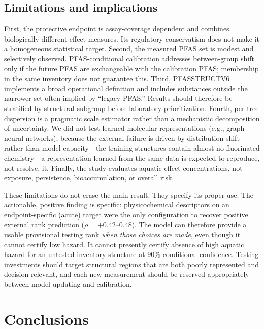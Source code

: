 \documentclass[journal=esthag,manuscript=article,margin=1in]{achemso}
\begin{document}
\subsection{Limitations and implications}

First, the protective endpoint is assay-coverage dependent and combines biologically different effect measures. Its regulatory conservatism does not make it a homogeneous statistical target. Second, the measured PFAS set is modest and selectively observed. PFAS-conditional calibration addresses between-group shift only if the future PFAS are exchangeable with the calibration PFAS; membership in the same inventory does not guarantee this. Third, PFASSTRUCTV6 implements a broad operational definition and includes substances outside the narrower set often implied by ``legacy PFAS.'' Results should therefore be stratified by structural subgroup before laboratory prioritization. Fourth, per-tree dispersion is a pragmatic scale estimator rather than a mechanistic decomposition of uncertainty. We did not test learned molecular representations (e.g., graph neural networks); because the external failure is driven by distribution shift rather than model capacity---the training structures contain almost no fluorinated chemistry---a representation learned from the same data is expected to reproduce, not resolve, it. Finally, the study evaluates aquatic effect concentrations, not exposure, persistence, bioaccumulation, or overall risk.

These limitations do not erase the main result. They specify its proper use. The actionable, positive finding is specific: physicochemical descriptors on an endpoint-specific (acute) target were the only configuration to recover positive external rank prediction ($\rho=+0.42$--$0.48$). The model can therefore provide a usable provisional testing rank \emph{when those choices are made}, even though it cannot certify low hazard. It cannot presently certify absence of high aquatic hazard for an untested inventory structure at 90\% conditional confidence. Testing investments should target structural regions that are both poorly represented and decision-relevant, and each new measurement should be reserved appropriately between model updating and calibration.

\section{Conclusions}
\end{document}
